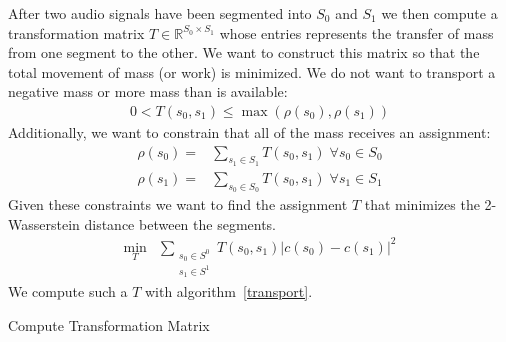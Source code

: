 \documentclass[12pt]{article}
\begin{document}
After two audio signals have been segmented into $S_0$ and $S_1$
we then compute a transformation matrix
$T\in \mathbb{R}^{S_0\times S_1}$
whose entries represents the transfer of mass from one segment to the other. 
We want to construct this matrix so that the total movement of mass (or work) is minimized.
We do not want to transport a negative mass or more mass than is available:
\begin{align}
  0 < T(s_0, s_1) \leq \max(\rho(s_0), \rho(s_1))
\end{align}
Additionally, we want to constrain that all of the mass receives an assignment:
\begin{align}
  \rho(s_0) = &\sum_{s_1\in S_1} T(s_0, s_1)
  \;
  \forall s_0\in S_0
  \\
  \rho(s_1) = &\sum_{s_0\in S_0} T(s_0, s_1)
  \;
  \forall s_1\in S_1
\end{align}
Given these constraints we want to find the assignment $T$ that minimizes the 2-Wasserstein distance between the segments.
\begin{align}
  \min_T &\sum_{\substack{s_0\in S^0\\ s_1\in S^1}} T(s_0, s_1)|c(s_0) - c(s_1)|^2
\end{align}
We compute such a $T$ with algorithm~\ref{transport}.

\begin{algorithm}
  \caption{Compute Transformation Matrix}\label{transport}
\begin{algorithmic}
    \Else
    \EndIf
  \EndWhile
\end{algorithmic}
\end{algorithm}
\end{document}
